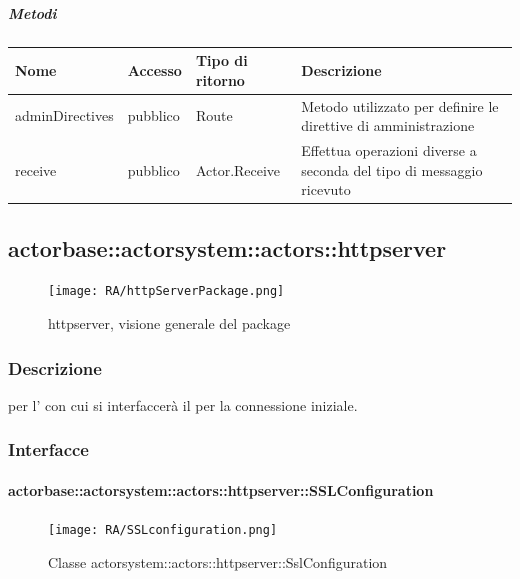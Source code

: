 \documentclass{scalatekids-article}
\begin{document}
\subparagraph{Metodi}

\begin{tabular}{| p{3cm} | p{1.5cm} | p{3.5cm} | p{9cm} |}
  \hline
  Nome & Accesso & Tipo di ritorno & Descrizione\\
  \hline
  adminDirectives & pubblico & Route & Metodo utilizzato per definire le direttive di amministrazione\\
  \hline
  receive & pubblico & Actor.Receive & Effettua operazioni diverse a seconda del tipo di messaggio ricevuto\\
  \hline
\end{tabular}


\subsection{actorbase::actorsystem::actors::httpserver}
\label{sec:actorbase::actorsystem::actors::httpserver}

\begin{figure}[H]
  \begin{center}
    \texttt{[image: RA/httpServerPackage.png]}
    \caption{httpserver, visione generale del package}
  \end{center}
\end{figure}

\subsubsection{Descrizione}
 per l' con cui si interfaccerà il  per la connessione iniziale.

\subsubsection{Interfacce}

\paragraph{actorbase::actorsystem::actors::httpserver::SSLConfiguration}
\label{sec:actorbase::actorsystem::actors::httpserver::SSLConfiguration}

\begin{figure}[H]
  \begin{center}
    \texttt{[image: RA/SSLconfiguration.png]}
    \caption{Classe actorsystem::actors::httpserver::SslConfiguration}
  \end{center}
\end{figure}
\end{document}
